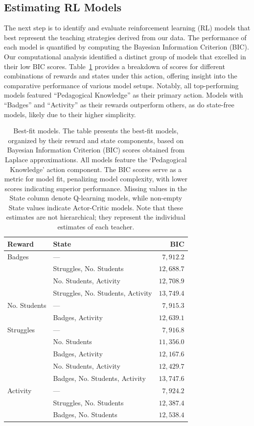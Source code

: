 \documentclass[
  number,
  preprint,
  3p,
  onecolumn]{elsarticle}
\begin{document}
\subsection{Estimating RL Models}\label{estimating-rl-models}

The next step is to identify and evaluate reinforcement learning (RL)
models that best represent the teaching strategies derived from our
data. The performance of each model is quantified by computing the
Bayesian Information Criterion (BIC). Our computational analysis
identified a distinct group of models that excelled in their low BIC
scores. Table~\ref{tbl-top-CBM} provides a breakdown of scores for
different combinations of rewards and states under this action, offering
insight into the comparative performance of various model setups.
Notably, all top-performing models featured ``Pedagogical Knowledge'' as
their primary action. Models with ``Badges'' and ``Activity'' as their
rewards outperform others, as do state-free models, likely due to their
higher simplicity.

\begin{longtable}{l|lr}

\caption{\label{tbl-top-CBM}Best-fit models. The table presents the
best-fit models, organized by their reward and state components, based
on Bayesian Information Criterion (BIC) scores obtained from Laplace
approximations. All models feature the `Pedagogical Knowledge' action
component. The BIC scores serve as a metric for model fit, penalizing
model complexity, with lower scores indicating superior performance.
Missing values in the State column denote Q-learning models, while
non-empty State values indicate Actor-Critic models. Note that these
estimates are not hierarchical; they represent the individual estimates
of each teacher.}

\tabularnewline

\toprule
\multicolumn{1}{l}{Reward} & State & BIC \\ 
\midrule\addlinespace[2.5pt]
Badges & — & $7,912.2$ \\ 
 & Struggles, No. Students & $12,688.7$ \\ 
 & No. Students, Activity & $12,708.9$ \\ 
 & Struggles, No. Students, Activity & $13,749.4$ \\ 
\midrule\addlinespace[2.5pt]
No. Students & — & $7,915.3$ \\ 
 & Badges, Activity & $12,639.1$ \\ 
\midrule\addlinespace[2.5pt]
Struggles & — & $7,916.8$ \\ 
 & No. Students & $11,356.0$ \\ 
 & Badges, Activity & $12,167.6$ \\ 
 & No. Students, Activity & $12,429.7$ \\ 
 & Badges, No. Students, Activity & $13,747.6$ \\ 
\midrule\addlinespace[2.5pt]
Activity & — & $7,924.2$ \\ 
 & Struggles, No. Students & $12,387.4$ \\ 
 & Badges, No. Students & $12,538.4$ \\ 
\bottomrule

\end{longtable}
\end{document}
